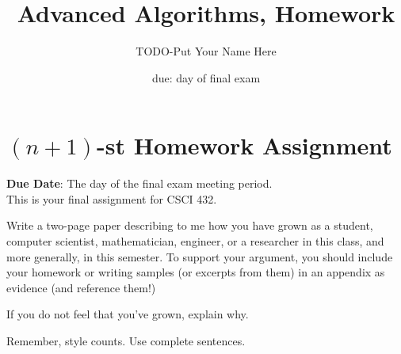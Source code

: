 \documentclass{article}
\title{Advanced Algorithms, Homework \hwnum}
\author{TODO-Put Your Name Here}
\date{due: day of final exam}
\begin{document}
\section*{$(n+1)$-st Homework Assignment}

{\bf{Due Date}}: The day of the final exam meeting period.\\

This is your final assignment for CSCI 432.

Write a two-page paper describing to me how you have grown as a student,
computer scientist, mathematician, engineer, or a researcher in this class, and
more generally, in this semester.  To support your argument, you should include
your homework or writing samples (or excerpts from them) in an appendix as
evidence (and reference them!)

If you do not feel that you've grown, explain why.

Remember, style counts. Use complete sentences.
\end{document}
